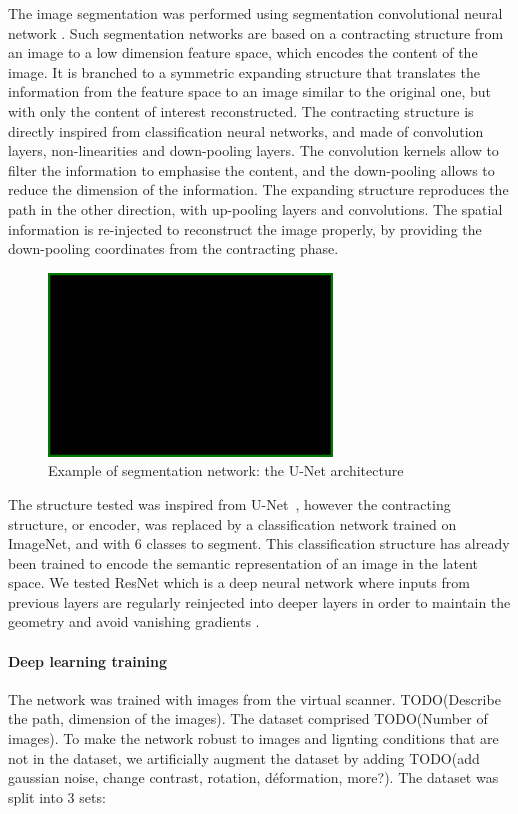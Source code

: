 The image segmentation was performed using segmentation convolutional
neural network \cite{guo_review_2018}. Such segmentation networks
are based on a contracting structure from an image to a low dimension
feature space, which encodes the content of the image. It is branched
to a symmetric expanding structure that translates the information from
the feature space to an image similar to the original one, but with
only the content of interest reconstructed. The contracting structure
is directly inspired from classification neural networks, and made
of convolution layers, non-linearities and down-pooling layers. The
convolution kernels allow to filter the information to emphasise
the content, and the down-pooling allows to reduce the dimension
of the information. The expanding structure reproduces the path in
the other direction, with up-pooling layers and convolutions. The
spatial information is re-injected to reconstruct the image properly,
by providing the down-pooling coordinates from the contracting phase.

\begin{figure}[h!]
    \centering \includegraphics[scale = 0.25]{figures/blank.png}
    \caption{Example of segmentation network: the U-Net architecture
    \cite{ronneberger_u-net:_2015}} \label{fig:unet}
\end{figure}

The structure tested was inspired from
U-Net~\cite{ronneberger_u-net:_2015}, however the contracting
structure, or encoder, was replaced by a classification network trained
on ImageNet, and with 6 classes to segment. This classification
structure has already been trained to encode the semantic
representation of an image in the latent space. We tested ResNet
\cite{he_deep_2015} which is a deep neural network where inputs
from previous layers are regularly reinjected into deeper layers
in order to maintain the geometry and avoid vanishing gradients
\cite{hochreiter_vanishing_1998}.


\paragraph{Deep learning training} The network was trained with
images from the virtual scanner. TODO(Describe the path, dimension
of the images). The dataset comprised TODO(Number of images). To make
the network robust to images and lignting conditions that are not in
the dataset, we artificially augment the dataset by adding TODO(add
gaussian noise, change contrast, rotation, déformation, more?).
The dataset was split into 3 sets:

